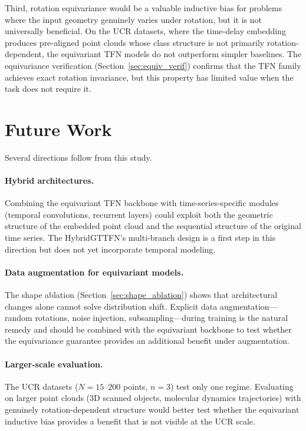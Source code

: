 \documentclass[a4paper,11pt]{article}
\begin{document}
Third, rotation equivariance would be a valuable inductive bias for problems where the input geometry genuinely varies under rotation, but it is not universally beneficial.
On the UCR datasets, where the time-delay embedding produces pre-aligned point clouds whose class structure is not primarily rotation-dependent, the equivariant TFN models do not outperform simpler baselines.
The equivariance verification (Section~\ref{sec:equiv_verif}) confirms that the TFN family achieves exact rotation invariance, but this property has limited value when the task does not require it.

\section{Future Work}

Several directions follow from this study.

\paragraph{Hybrid architectures.}
Combining the equivariant TFN backbone with time-series-specific modules (temporal convolutions, recurrent layers) could exploit both the geometric structure of the embedded point cloud and the sequential structure of the original time series.
The HybridGTTFN's multi-branch design is a first step in this direction but does not yet incorporate temporal modeling.

\paragraph{Data augmentation for equivariant models.}
The shape ablation (Section~\ref{sec:shape_ablation}) shows that architectural changes alone cannot solve distribution shift.
Explicit data augmentation---random rotations, noise injection, subsampling---during training is the natural remedy and should be combined with the equivariant backbone to test whether the equivariance guarantee provides an additional benefit under augmentation.

\paragraph{Larger-scale evaluation.}
The UCR datasets ($N=15$--$200$ points, $n=3$) test only one regime.
Evaluating on larger point clouds (3D scanned objects, molecular dynamics trajectories) with genuinely rotation-dependent structure would better test whether the equivariant inductive bias provides a benefit that is not visible at the UCR scale.
\end{document}
